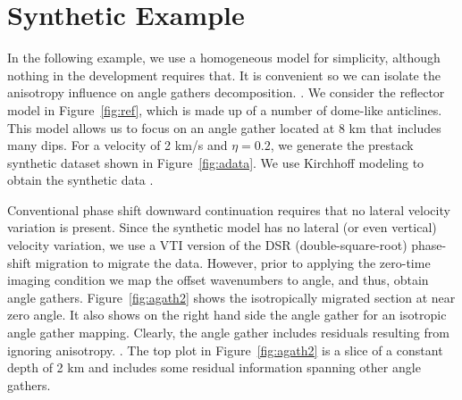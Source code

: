\section{Synthetic Example}

In the following example, we use a homogeneous model for simplicity, although nothing in the development requires that.
It is convenient so we can isolate the anisotropy influence on angle gathers decomposition. .
We consider the reflector model in Figure~\ref{fig:ref}, which is
made up of a number of dome-like anticlines. This model allows us to focus on an angle gather located at 8 km that includes many dips. For a velocity of 2 km/s
and $\eta=0.2$, we generate the prestack synthetic dataset shown in Figure~\ref{fig:adata}. We use Kirchhoff modeling to obtain the synthetic data \cite[]{GEO60-04-11391150}. 

Conventional phase shift downward continuation requires that no lateral velocity variation is present. Since the synthetic model has no lateral (or even vertical) velocity
variation, we use a VTI version of the DSR (double-square-root) phase-shift migration \cite[]{GEO65-04-11791194} to migrate the data. However, prior to applying the zero-time imaging condition we map the offset wavenumbers 
to angle, and thus, obtain angle gathers. Figure~\ref{fig:agath2} shows the isotropically migrated section at near zero angle. It also shows on the right hand side the 
angle gather for an isotropic angle
gather mapping. Clearly, the angle gather includes residuals resulting from ignoring anisotropy.  \cite[]{GEO60-05-15501566}. The top plot in Figure~\ref{fig:agath2} is 
a slice of a constant depth of 2 km and includes some residual information spanning other angle gathers.

